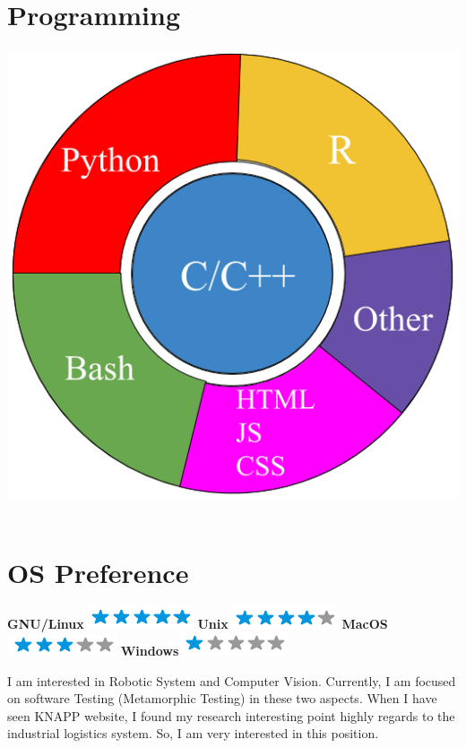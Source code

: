 \documentclass[]{friggeri-cv}
\begin{document}
\begin{aside}
  \section{Programming}
    \includegraphics[scale=0.2]{img/programming.png}
    ~
  \section{OS Preference}
    \textbf{GNU/Linux}\includegraphics[scale=0.40]{img/5stars.png}
    \textbf{Unix}\includegraphics[scale=0.40]{img/4stars.png}
    \textbf{MacOS}\includegraphics[scale=0.40]{img/3stars.png}
    \textbf{Windows}\includegraphics[scale=0.40]{img/1stars.png}
    ~
\end{aside}



I am interested in Robotic System and Computer Vision. Currently, I am focused on software Testing (Metamorphic Testing) in these two aspects. When I have seen KNAPP website, I found my research interesting point highly regards to the industrial logistics system. So, I am very interested in this position.
\end{document}
